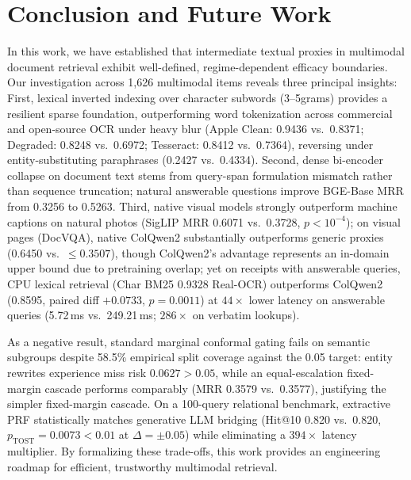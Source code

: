 \vspace{-1.5mm}\section{Conclusion and Future Work}
\label{sec:conclusion}

In this work, we have established that intermediate textual proxies in multimodal document retrieval exhibit well-defined, regime-dependent efficacy boundaries. Our investigation across 1,626 multimodal items reveals three principal insights: First, lexical inverted indexing over character subwords (3--5grams) provides a resilient sparse foundation, outperforming word tokenization across commercial and open-source OCR under heavy blur (Apple Clean: 0.9436 vs.\ 0.8371; Degraded: 0.8248 vs.\ 0.6972; Tesseract: 0.8412 vs.\ 0.7364), reversing under entity-substituting paraphrases (0.2427 vs.\ 0.4334). Second, dense bi-encoder collapse on document text stems from query-span formulation mismatch rather than sequence truncation; natural answerable questions improve BGE-Base MRR from 0.3256 to 0.5263. Third, native visual models strongly outperform machine captions on natural photos (SigLIP MRR 0.6071 vs.\ 0.3728, $p < 10^{-4}$); on visual pages (DocVQA), native ColQwen2 substantially outperforms generic proxies (0.6450 vs.\ $\le 0.3507$), though ColQwen2's advantage represents an in-domain upper bound due to pretraining overlap; yet on receipts with answerable queries, CPU lexical retrieval (Char BM25 0.9328 Real-OCR) outperforms ColQwen2 (0.8595, paired diff $+0.0733$, $p=0.0011$) at $44\times$ lower latency on answerable queries (5.72\,ms vs.\ 249.21\,ms; $286\times$ on verbatim lookups).

As a negative result, standard marginal conformal gating fails on semantic subgroups despite 58.5\% empirical split coverage against the 0.05 target: entity rewrites experience miss risk $0.0627 > 0.05$, while an equal-escalation fixed-margin cascade performs comparably (MRR 0.3579 vs.\ 0.3577), justifying the simpler fixed-margin cascade. On a 100-query relational benchmark, extractive PRF statistically matches generative LLM bridging (Hit@10 0.820 vs.\ 0.820, $p_{\text{TOST}}=0.0073 < 0.01$ at $\Delta=\pm 0.05$) while eliminating a $394\times$ latency multiplier. By formalizing these trade-offs, this work provides an engineering roadmap for efficient, trustworthy multimodal retrieval.

